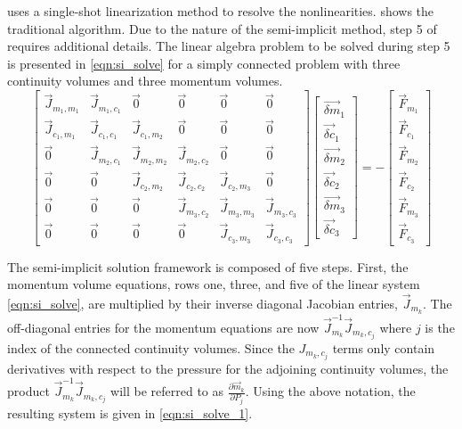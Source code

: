 \cobra{} uses a single-shot linearization method to resolve the nonlinearities.
 shows the traditional algorithm.
Due to the nature of the semi-implicit method, step 5 of  requires additional details.
The linear algebra problem to be solved during step 5 is presented in \eqref{eqn:si_solve} for a simply connected problem with three continuity volumes and three momentum volumes.
 \begin{equation}
 \label{eqn:si_solve}
 \begin{bmatrix} 
 \vec{J}_{m_1,m_1} & \vec{J}_{m_1,c_1} & \vec{0} & \vec{0} & \vec{0} & \vec{0}\\
 \vec{J}_{c_1,m_1} & \vec{J}_{c_1,c_1} & \vec{J}_{c_1,m_2} & \vec{0} & \vec{0} & \vec{0} \\
 \vec{0} & \vec{J}_{m_2,c_1} & \vec{J}_{m_2,m_2} & \vec{J}_{m_2,c_2} & \vec{0} & \vec{0} \\
 \vec{0} & \vec{0} & \vec{J}_{c_2,m_2} & \vec{J}_{c_2,c_2} & \vec{J}_{c_2,m_3} & \vec{0} \\
 \vec{0} & \vec{0} & \vec{0} & \vec{J}_{m_3,c_2} & \vec{J}_{m_3,m_3} & \vec{J}_{m_3,c_3} \\ 
 \vec{0} & \vec{0} & \vec{0} & \vec{0} & \vec{J}_{c_3,m_3} & \vec{J}_{c_3,c_3}  
 \end{bmatrix} \begin{bmatrix}
 \vec{\delta m}_{1} \\ \vec{\delta c}_{1} \\
 \vec{\delta m}_{2} \\ \vec{\delta c}_{2} \\
 \vec{\delta m}_{3} \\ \vec{\delta c}_{3}
\end{bmatrix}  = -\begin{bmatrix}
 \vec{F}_{m_1} \\ \vec{F}_{c_1} \\
 \vec{F}_{m_2} \\ \vec{F}_{c_2} \\
 \vec{F}_{m_3} \\ \vec{F}_{c_3} \end{bmatrix}
 \end{equation}
 
 The semi-implicit solution framework is composed of five steps.
 First, the momentum volume equations, rows one, three, and five of the linear system \eqref{eqn:si_solve}, are multiplied by their inverse diagonal Jacobian entries, $\vec{J}_{m_k}$.
 The off-diagonal entries for the momentum equations are now $\vec{J}^{-1}_{m_k}\vec{J}_{m_k,c_j}$ where $j$ is the index of the connected continuity volumes.
 Since the $J_{m_k,c_j}$ terms only contain derivatives with respect to the pressure for the adjoining continuity volumes, the product $\vec{J}^{-1}_{m_k}\vec{J}_{m_k,c_j}$ will be referred to as $\frac{\partial \vec{m}_k}{\partial P_j}$.
 Using the above notation, the resulting system is given in \eqref{eqn:si_solve_1}.
 
